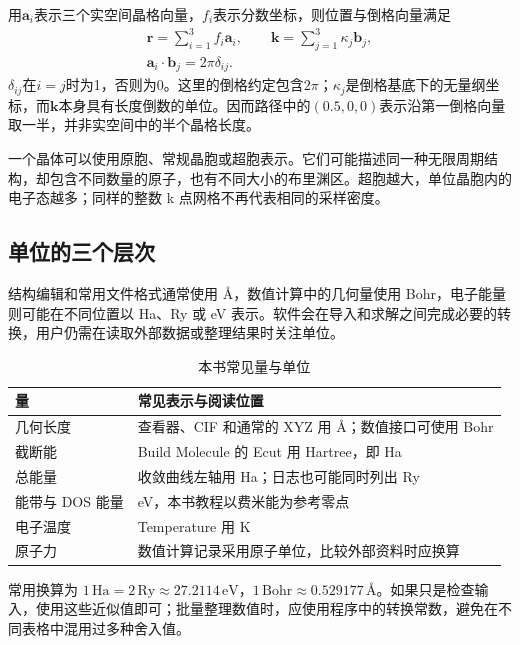 用$\mathbf a_i$表示三个实空间晶格向量，$f_i$表示分数坐标，则位置与倒格向量满足
\begin{equation}
  \begin{gathered}
  \mathbf r=\sum_{i=1}^{3}f_i\mathbf a_i,
  \qquad \mathbf k=\sum_{j=1}^{3}\kappa_j\mathbf b_j,\\
  \mathbf a_i\!\cdot\!\mathbf b_j=2\pi\delta_{ij}.
  \end{gathered}
  \label{eq:reciprocal-convention}
\end{equation}
$\delta_{ij}$在$i=j$时为1，否则为0。这里的倒格约定包含$2\pi$；$\kappa_j$是倒格基底下的无量纲坐标，而$\mathbf k$本身具有长度倒数的单位。因而路径中的$(0.5,0,0)$表示沿第一倒格向量取一半，并非实空间中的半个晶格长度。

一个晶体可以使用原胞、常规晶胞或超胞表示。它们可能描述同一种无限周期结构，却包含不同数量的原子，也有不同大小的布里渊区。超胞越大，单位晶胞内的电子态越多；同样的整数 k 点网格不再代表相同的采样密度。

\subsection{单位的三个层次}

结构编辑和常用文件格式通常使用 Å，数值计算中的几何量使用 Bohr，电子能量则可能在不同位置以 Ha、Ry 或 eV 表示。软件会在导入和求解之间完成必要的转换，用户仍需在读取外部数据或整理结果时关注单位。

\begin{table}[htbp]
\centering
\caption{本书常见量与单位}
\begin{tabularx}{\linewidth}{lX}
\toprule
量 & 常见表示与阅读位置\\
\midrule
几何长度 & 查看器、CIF 和通常的 XYZ 用 Å；数值接口可使用 Bohr\\
截断能 & Build Molecule 的 Ecut 用 Hartree，即 Ha\\
总能量 & 收敛曲线左轴用 Ha；日志也可能同时列出 Ry\\
能带与 DOS 能量 & eV，本书教程以费米能为参考零点\\
电子温度 & Temperature 用 K\\
原子力 & 数值计算记录采用原子单位，比较外部资料时应换算\\
\bottomrule
\end{tabularx}
\end{table}

常用换算为 $1\,\mathrm{Ha}=2\,\mathrm{Ry}\approx27.2114\,\mathrm{eV}$，$1\,\mathrm{Bohr}\approx0.529177\,\text{Å}$。如果只是检查输入，使用这些近似值即可；批量整理数值时，应使用程序中的转换常数，避免在不同表格中混用过多种舍入值。

